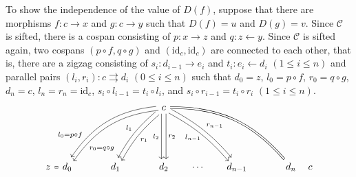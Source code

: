 \documentclass[a4paper,12pt,reqno]{amsart}
\begin{document}
To show the independence of the value of $D(f)$, suppose that there are morphisms $f\colon c \to x$ and $g\colon c\to y$ such that $D(f)=u$ and $D(g)=v$.
Since $\mathcal{C}$ is sifted, there is a cospan consisting of $p\colon x \rightarrow z$ and $q\colon z \leftarrow y$.
Since $\mathcal{C}$ is sifted again, two cospans $(p\circ f, q\circ g)$ and $(\mathrm{id}_c, \mathrm{id}_c)$ are connected to each other, that is, there are a zigzag consisting of $s_i\colon d_{i-1} \rightarrow e_i$ and $t_i\colon e_i \leftarrow d_i$ $(1 \le i \le n)$ and parallel pairs $(l_i,r_i)\colon c \rightrightarrows d_i$ $(0 \le i \le n)$ such that $d_0=z$, $l_0=p\circ f$, $r_0=q\circ g$, $d_n=c$, $l_n=r_n=\mathrm{id}_c$, $s_i \circ l_{i-1} = t_i \circ l_i$, and $s_i \circ r_{i-1} = t_i \circ r_i$ $(1\le i\le n)$.
\begin{equation*}
    \begin{tikzcd}[column sep = 1.6em]
            &[-1.2em]
                &
                    &
                        &
                            &
                            c
                            \ar[dllll,bend right=25,shift right=1,"l_0 = p\circ f"',pos=0.8]
                            \ar[dllll,bend right=25,shift left=1,"r_0 = q\circ g",pos=0.8]
                            \ar[dll,bend right=10,shift right=1,"l_1"']
                            \ar[dll,bend right=10,shift left=1,"r_1"]
                            \ar[d,shift right=1,"l_2"']
                            \ar[d,shift left=1,"r_2"]
                            \ar[drrrr,bend left=25,equal]
                            \ar[drr,bend left=10,shift right=1,"l_{n-1}"{below left=-2}]
                            \ar[drr,bend left=10,shift left=1,"r_{n-1}"]
                                &
                                    &
                                        &
                                            &
                                                &[-1.2em]
        \\[30pt]
        z
        \ar[r,equal]
            &
            d_0
                &
                    &
                    d_1
                        &
                            &
                            d_2
                                &
                                \cdots
                                    &
                                    d_{n-1}
                                        &
                                            &
                                            d_n
                                                &
                                                c

\end{tikzcd}
\end{equation*}
\end{document}
